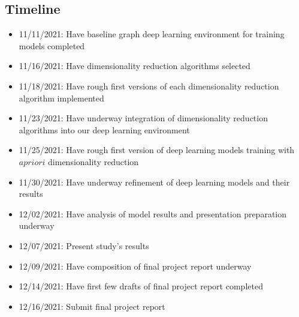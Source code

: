 \documentclass[11pt]{article}
\begin{document}
\subsection{Timeline}
\label{sec:org3ae2b44}
\begin{itemize}
\item 11/11/2021: Have baseline graph deep learning environment for training models completed
\item 11/16/2021: Have dimensionality reduction algorithms selected
\item 11/18/2021: Have rough first versions of each dimensionality reduction algorithm implemented
\item 11/23/2021: Have underway integration of dimensionality reduction algorithms into our deep learning environment
\item 11/25/2021: Have rough first version of deep learning models training with \(a priori\) dimensionality reduction
\item 11/30/2021: Have underway refinement of deep learning models and their results
\item 12/02/2021: Have analysis of model results and presentation preparation underway
\item 12/07/2021: Present study's results
\item 12/09/2021: Have composition of final project report underway
\item 12/14/2021: Have first few drafts of final project report completed
\item 12/16/2021: Submit final project report
\end{itemize}



\end{document}
